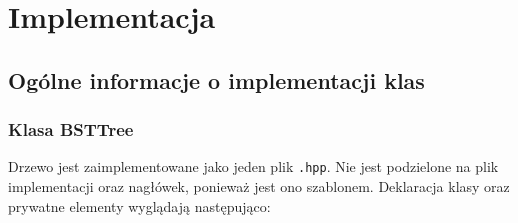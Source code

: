 	\newpage
\section{Implementacja}		%

\subsection{Ogólne informacje o implementacji klas}

\subsubsection{Klasa BSTTree}

Drzewo jest zaimplementowane jako jeden plik \texttt{.hpp}. Nie jest podzielone na plik implementacji oraz nagłówek, ponieważ jest ono szablonem. Deklaracja klasy oraz prywatne elementy wyglądają następująco:

